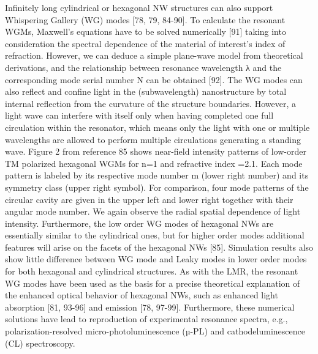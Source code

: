 Infinitely long cylindrical or hexagonal NW structures can also support
Whispering Gallery (WG) modes [78, 79, 84-90]. To calculate the resonant WGMs,
Maxwell’s equations have to be solved numerically [91] taking into
consideration the spectral dependence of the material of interest’s index of
refraction. However, we can deduce a simple plane-wave model from theoretical
derivations, and the relationship between resonance wavelength λ and the
corresponding mode serial number N can be obtained [92]. The WG modes can also
reflect and confine light in the (subwavelength) nanostructure by total
internal reflection from the curvature of the structure boundaries. However, a
light wave can interfere with itself only when having completed one full
circulation within the resonator, which means only the light with one or
multiple wavelengths are allowed to perform multiple circulations generating a
standing wave. Figure 2 from reference 85 shows near-field intensity patterns
of low-order TM polarized hexagonal WGMs for n=1 and refractive index =2.1.
Each mode pattern is labeled by its respective mode number m (lower right
number) and its symmetry class (upper right symbol).  For comparison, four mode
patterns of the circular cavity are given in the upper left and lower right
together with their angular mode number. We again observe the radial spatial
dependence of light intensity. Furthermore, the low order WG modes of hexagonal
NWs are essentially similar to the cylindrical ones, but for higher order modes
additional features will arise on the facets of the hexagonal NWs [85].
Simulation results also show little difference between WG mode and Leaky modes
in lower order modes for both hexagonal and cylindrical structures. As with the
LMR, the resonant WG modes have been used as the basis for a precise
theoretical explanation of the enhanced optical behavior of hexagonal NWs, such
as enhanced light absorption [81, 93-96] and emission [78, 97-99]. Furthermore,
these numerical solutions have lead to reproduction of experimental resonance
spectra, e.g., polarization-resolved micro-photoluminescence (µ-PL) and
cathodeluminescence (CL) spectroscopy.  

